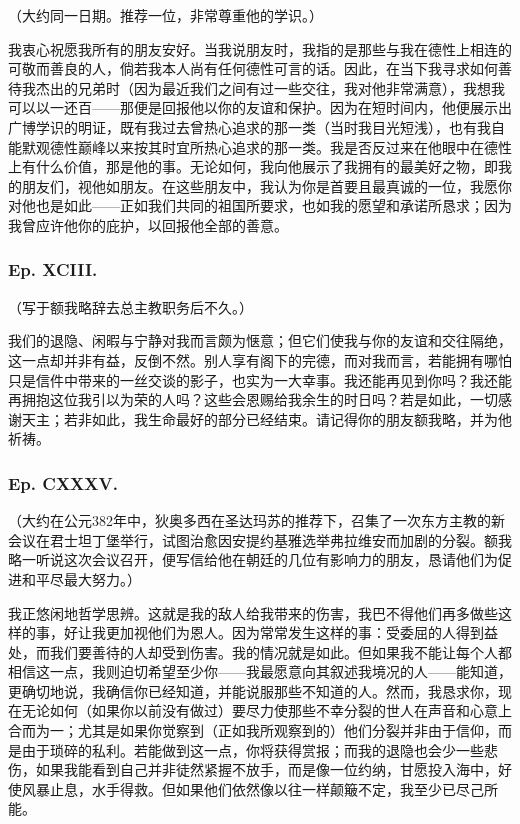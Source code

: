 （大约同一日期。推荐一位，非常尊重他的学识。）\par

我衷心祝愿我所有的朋友安好。当我说朋友时，我指的是那些与我在德性上相连的可敬而善良的人，倘若我本人尚有任何德性可言的话。因此，在当下我寻求如何善待我杰出的兄弟时（因为最近我们之间有过一些交往，我对他非常满意），我想我可以以一还百——那便是回报他以你的友谊和保护。因为在短时间内，他便展示出广博学识的明证，既有我过去曾热心追求的那一类（当时我目光短浅），也有我自能默观德性巅峰以来按其时宜所热心追求的那一类。我是否反过来在他眼中在德性上有什么价值，那是他的事。无论如何，我向他展示了我拥有的最美好之物，即我的朋友们，视他如朋友。在这些朋友中，我认为你是首要且最真诚的一位，我愿你对他也是如此——正如我们共同的祖国所要求，也如我的愿望和承诺所恳求；因为我曾应许他你的庇护，以回报他全部的善意。\par


\subsubsection{Ep. XCIII.}

（写于额我略辞去总主教职务后不久。）\par

我们的退隐、闲暇与宁静对我而言颇为惬意；但它们使我与你的友谊和交往隔绝，这一点却并非有益，反倒不然。别人享有阁下的完德，而对我而言，若能拥有哪怕只是信件中带来的一丝交谈的影子，也实为一大幸事。我还能再见到你吗？我还能再拥抱这位我引以为荣的人吗？这些会恩赐给我余生的时日吗？若是如此，一切感谢天主；若非如此，我生命最好的部分已经结束。请记得你的朋友额我略，并为他祈祷。\par


\subsubsection{Ep. CXXXV.}

（大约在公元382年中，狄奥多西在圣达玛苏的推荐下，召集了一次东方主教的新会议在君士坦丁堡举行，试图治愈因安提约基雅选举弗拉维安而加剧的分裂。额我略一听说这次会议召开，便写信给他在朝廷的几位有影响力的朋友，恳请他们为促进和平尽最大努力。）\par

我正悠闲地哲学思辨。这就是我的敌人给我带来的伤害，我巴不得他们再多做些这样的事，好让我更加视他们为恩人。因为常常发生这样的事：受委屈的人得到益处，而我们要善待的人却受到伤害。我的情况就是如此。但如果我不能让每个人都相信这一点，我则迫切希望至少你——我最愿意向其叙述我境况的人——能知道，更确切地说，我确信你已经知道，并能说服那些不知道的人。然而，我恳求你，现在无论如何（如果你以前没有做过）要尽力使那些不幸分裂的世人在声音和心意上合而为一；尤其是如果你觉察到（正如我所观察到的）他们分裂并非由于信仰，而是由于琐碎的私利。若能做到这一点，你将获得赏报；而我的退隐也会少一些悲伤，如果我能看到自己并非徒然紧握不放手，而是像一位约纳，甘愿投入海中，好使风暴止息，水手得救。但如果他们依然像以往一样颠簸不定，我至少已尽己所能。\par

